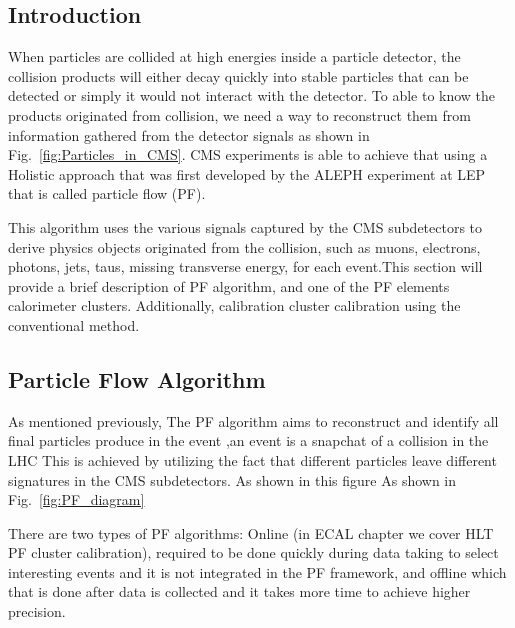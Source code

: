 \subsection{Introduction}
When particles are collided at high energies inside a particle detector, the collision products will either decay quickly into stable particles that can be detected or simply it would not interact with the detector. To able to know the products originated from collision, we need a way to reconstruct them from information gathered from the detector signals as shown in Fig.~\ref{fig:Particles_in_CMS}. 
CMS experiments is able to achieve that using a Holistic approach that was first developed by the ALEPH experiment at LEP that is called particle flow (PF).

This algorithm uses the various signals captured by the CMS subdetectors to derive physics objects originated from the collision, such as muons, electrons, photons, jets, taus, missing transverse energy, for each event.This section will provide a brief description of PF algorithm, and one of the PF elements calorimeter clusters. Additionally, calibration cluster calibration using the conventional method. %

\subsection{Particle Flow Algorithm}
As mentioned previously, The PF algorithm aims to reconstruct and identify all final particles produce in the event ,an event is a snapchat of a collision in the LHC %
This is achieved by utilizing the fact that different particles leave different signatures in the CMS subdetectors. As shown in this figure As shown in Fig.~\ref{fig:PF_diagram}

There are two types of PF algorithms: Online (in ECAL chapter we cover HLT PF cluster calibration), required to be done quickly during data taking to select interesting events and it is not integrated in the PF framework, and offline which that is done after data is collected and it takes more time to achieve higher precision. %

